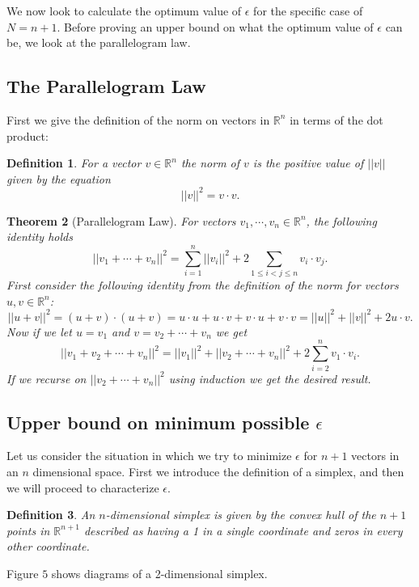 \documentclass[11pt,letterpaper,twoside,english]{article}
\theoremstyle{theorem}
\newtheorem{theorem}{Theorem}[section]
\newtheorem{definition}[theorem]{Definition}
\theoremstyle{remark}
\providecommand{\R}{\mathbb{R}}
\begin{document}
We now look to calculate the optimum value of $\epsilon$ for the specific case of $N = n+1$. Before proving an upper bound on what the optimum value of $\epsilon$ can be, we look at the parallelogram law.

\subsection{The Parallelogram Law}

First we give the definition of the norm on vectors in $\R^n$ in terms of the dot product:

\begin{definition}
For a vector $v\in\R^n$ the norm of $v$ is the positive value of $||v||$ given by the equation
$$
||v||^2=v\cdot v.
$$
\end{definition}
\begin{theorem}[Parallelogram Law]
For vectors $v_1,\cdots,v_n\in\R^n$, the following identity holds
$$
||v_1+\cdots+v_n||^2=\displaystyle\sum_{i=1}^n||v_i||^2+2\displaystyle\sum_{1\le i<j\le n}v_i\cdot v_j.
$$
\proof
First consider the following identity from the definition of the norm for vectors $u,v\in\R^n$:
$$
||u+v||^2=(u+v)\cdot (u+v)=u\cdot u+u\cdot v+ v\cdot u + v\cdot v=||u||^2+||v||^2+2u\cdot v.
$$
Now if we let $u=v_1$ and $v= v_2+\cdots+v_n$ we get 
$$
||v_1+v_2+\cdots+v_n||^2=||v_1||^2+||v_2+\cdots +v_n||^2+2\sum_{i=2}^n v_1\cdot v_i.
$$
If we recurse on $||v_2+\cdots +v_n||^2$ using induction we get the desired result. 
\end{theorem}


\subsection{Upper bound on minimum possible $\epsilon$}
Let us consider the situation in which we try to minimize $\epsilon$ for $n+1$ vectors in an $n$ dimensional space. First we introduce the definition of a simplex, and then we will proceed to characterize $\epsilon$. 

\begin{definition}
An $n$-dimensional simplex is given by the convex hull of the $n+1$ points in $\R^{n+1}$ described as having a 1 in a single coordinate and zeros in every other coordinate. 
\end{definition}

Figure $5$ shows diagrams of a 2-dimensional simplex.
\end{document}
